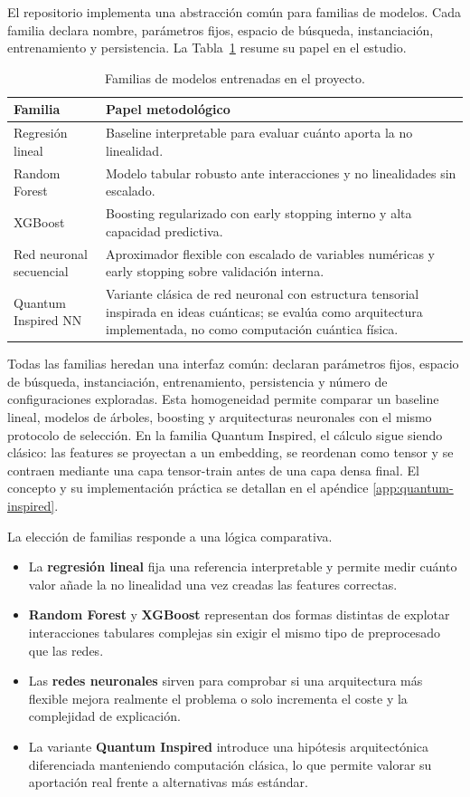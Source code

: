 El repositorio implementa una abstracción común para familias de modelos. Cada familia declara nombre, parámetros fijos, espacio de búsqueda, instanciación, entrenamiento y persistencia. La Tabla~\ref{tab:familias} resume su papel en el estudio.

\begin{table}[htbp]
\centering
\small
\begin{tabular}{p{}p{}}
\toprule
Familia & Papel metodológico \\
\midrule
Regresión lineal & Baseline interpretable para evaluar cuánto aporta la no linealidad. \\
Random Forest & Modelo tabular robusto ante interacciones y no linealidades sin escalado. \\
XGBoost & Boosting regularizado con early stopping interno y alta capacidad predictiva. \\
Red neuronal secuencial & Aproximador flexible con escalado de variables numéricas y early stopping sobre validación interna. \\
Quantum Inspired NN & Variante clásica de red neuronal con estructura tensorial inspirada en ideas cuánticas; se evalúa como arquitectura implementada, no como computación cuántica física. \\
\bottomrule
\end{tabular}
\caption{Familias de modelos entrenadas en el proyecto.}
\label{tab:familias}
\end{table}

Todas las familias heredan una interfaz común: declaran parámetros fijos, espacio de búsqueda, instanciación, entrenamiento, persistencia y número de configuraciones exploradas. Esta homogeneidad permite comparar un baseline lineal, modelos de árboles, boosting y arquitecturas neuronales con el mismo protocolo de selección. En la familia Quantum Inspired, el cálculo sigue siendo clásico: las features se proyectan a un embedding, se reordenan como tensor y se contraen mediante una capa tensor-train antes de una capa densa final. El concepto y su implementación práctica se detallan en el apéndice \ref{app:quantum-inspired}.

La elección de familias responde a una lógica comparativa.

\begin{itemize}
  \item La \textbf{regresión lineal} fija una referencia interpretable y permite medir cuánto valor añade la no linealidad una vez creadas las features correctas.
  \item \textbf{Random Forest} y \textbf{XGBoost} representan dos formas distintas de explotar interacciones tabulares complejas sin exigir el mismo tipo de preprocesado que las redes.
  \item Las \textbf{redes neuronales} sirven para comprobar si una arquitectura más flexible mejora realmente el problema o solo incrementa el coste y la complejidad de explicación.
  \item La variante \textbf{Quantum Inspired} introduce una hipótesis arquitectónica diferenciada manteniendo computación clásica, lo que permite valorar su aportación real frente a alternativas más estándar.
\end{itemize}

